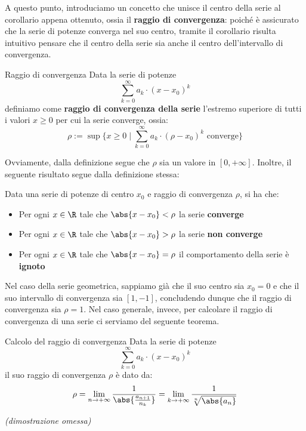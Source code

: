 \documentclass[a4paper, 12pt]{report}
\begin{document}
    A questo punto, introduciamo un concetto che unisce il centro della serie al corollario appena ottenuto, ossia il \textbf{raggio di convergenza}: poiché è assicurato che la serie di potenze converga nel suo centro, tramite il corollario risulta intuitivo pensare che il centro della serie sia anche il centro dell'intervallo di convergenza.

    \begin{frameddefn}{Raggio di convergenza}
        Data la serie di potenze
        \[\sum_{k = 0}^{\infty} a_k \cdot (x-x_0)^k\]
        definiamo come \textbf{raggio di convergenza della serie} l'estremo superiore di tutti i valori $x \geq 0$ per cui la serie converge, ossia:
        \[\rho := \sup \{x \geq 0 \mid \sum_{k = 0}^{\infty} a_k \cdot (\rho-x_0)^k \text{ converge}\}\]
    \end{frameddefn}

    Ovviamente, dalla definizione segue che $\rho$ sia un valore in $[0, +\infty]$. Inoltre, il seguente risultato segue dalla definizione stessa:

    \begin{framedprop}{}
        Data una serie di potenze di centro $x_0$ e raggio di convergenza $\rho$, si ha che:
        \begin{itemize}
            \item Per ogni $x \in \R$ tale che $\abs{x-x_0} < \rho$ la serie \textbf{converge}
            \item Per ogni $x \in \R$ tale che $\abs{x-x_0} > \rho$ la serie \textbf{non converge}
            \item Per ogni $x \in \R$ tale che $\abs{x-x_0} = \rho$ il comportamento della serie è \textbf{ignoto}
        \end{itemize} 
    \end{framedprop}

    Nel caso della serie geometrica, sappiamo già che il suo centro sia $x_0 = 0$ e che il suo intervallo di convergenza sia $[1, -1]$, concludendo dunque che il raggio di convergenza sia $\rho = 1$. Nel caso generale, invece, per calcolare il raggio di convergenza di una serie ci serviamo del seguente teorema.

    \begin{framedthm}{Calcolo del raggio di convergenza}
        Data la serie di potenze
        \[\sum_{k = 0}^{\infty} a_k \cdot (x-x_0)^k\]
        il suo raggio di convergenza $\rho$ è dato da:
        $$
        \rho =  \lim_{n \to +\infty} \frac{1}{\abs{\frac{a_{n+1}}{n_k}}} = \lim_{k \to +\infty} \frac{1}{\sqrt[n]{\abs{a_n}}}
        $$

        \textit{(dimostrazione omessa)}
    \end{framedthm}
\end{document}
